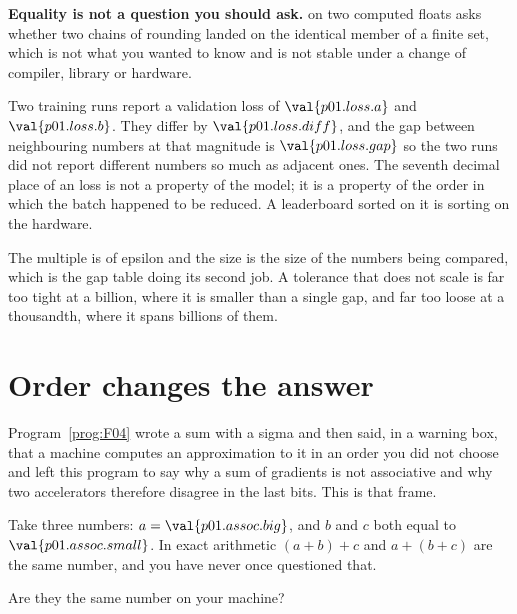 \begin{fr}

\textbf{Equality is not a question you should ask.}  on two
computed floats asks whether two chains of rounding landed on the identical
member of a finite set, which is not what you wanted to know and is not stable
under a change of compiler, library or hardware.

\begin{aibox}
Two training runs report a validation loss of $\val{p01.loss.a}$ and
$\val{p01.loss.b}$. They differ by $\val{p01.loss.diff}$, and the gap between
neighbouring  numbers at that magnitude is $\val{p01.loss.gap}$
\dash{} so the two runs did not report different numbers so much as adjacent
ones. The seventh decimal place of an  loss is not a property of the
model; it is a property of the order in which the batch happened to be reduced.
A leaderboard sorted on it is sorting on the hardware.
\end{aibox}

The multiple is of epsilon and the size is the size of the numbers being
compared, which is the gap table doing its second job. A tolerance that does
not scale is far too tight at a billion, where it is smaller than a single
gap, and far too loose at a thousandth, where it spans billions of them.
\end{fr}

\section{Order changes the answer}
\label{sec:P01-order}

\begin{fr}
Program~\ref{prog:F04} wrote a sum with a sigma and then said, in a warning
box, that a machine computes an approximation to it in an order you did not
choose \dash{} and left this program to say why a sum of gradients is not
associative and why two accelerators therefore disagree in the last bits. This
is that frame.

Take three numbers: $a = \val{p01.assoc.big}$, and $b$ and $c$ both equal to
$\val{p01.assoc.small}$. In exact arithmetic $(a + b) + c$ and $a + (b + c)$
are the same number, and you have never once questioned that.

Are they the same number on your machine?
\nextframe
\end{fr}

